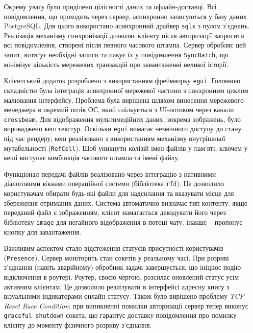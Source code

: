 \documentclass[14pt, a4paper]{extreport}
\begin{document}
	
	Окрему увагу було приділено цілісності даних та офлайн-доставці. Всі повідомлення, що проходять через сервер, асинхронно записуються у базу даних PostgreSQL. Для цього використано асинхронний драйвер \texttt{sqlx} з пулом з'єднань. Реалізація механізму синхронізації дозволяє клієнту після авторизації запросити всі повідомлення, створені після певного часового штампа. Сервер обробляє цей запит, витягує необхідні записи та пакує їх у повідомлення \texttt{SyncBatch}, що мінімізує кількість мережевих транзакцій при завантаженні великої історії.
	
	Клієнтський додаток розроблено з використанням фреймворку \texttt{egui}. Головною складністю була інтеграція асинхронної мережевої частини з синхронним циклом малювання інтерфейсу. Проблема була вирішена шляхом винесення мережевого менеджера в окремий потік ОС, який спілкується з UI-потоком через канали \texttt{crossbeam}. Для відображення мультимедійних даних, зокрема зображень, було впроваджено кеш текстур. Оскільки \texttt{egui} вимагає незмінного доступу до стану під час рендеру, кеш реалізовано з використанням механізму внутрішньої мутабельності (\texttt{RefCell}). Щоб уникнути колізій імен файлів у пам'яті, ключем у кеші виступає комбінація часового штампа та імені файлу.
	
	
	Функціонал передачі файлів реалізовано через інтеграцію з нативними діалоговими вікнами операційної системи (бібліотека \texttt{rfd}). Це дозволило користувачам обирати будь-які файли для надсилання та вказувати місце для збереження отриманих даних. Система автоматично визначає тип контенту: якщо переданий файл є зображенням, клієнт намагається декодувати його через бібліотеку \texttt{image} для негайного відображення в потоці чату, інакше -- пропонує кнопку для завантаження.
	
	Важливим аспектом стало відстеження статусів присутності користувачів (\texttt{Presence}). Сервер моніторить стан сокетів у реальному часі. При розриві з'єднання (навіть аварійному) обробник задачі завершується, що ініціює подію відключення в роутері. Роутер, своєю чергою, розсилає оновлений статус усім активним клієнтам. Це дозволило реалізувати в інтерфейсі адресну книгу з візуальними індикаторами онлайн-статусу. Також було вирішено проблему \textit{TCP Reset Race Condition}: при виникненні помилки авторизації сервер тепер виконує \texttt{graceful shutdown} сокета, що гарантує доставку повідомлення про помилку клієнту до моменту фізичного розриву з'єднання.
	
\end{document}
